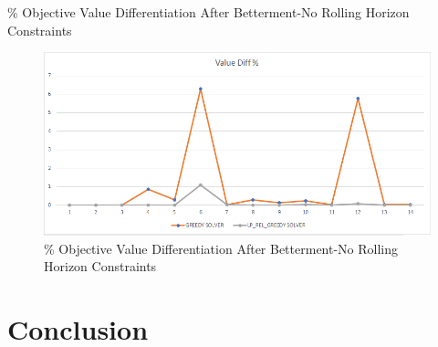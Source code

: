 \documentclass[11pt]{article}
\begin{document}
{\begin{landscape}
        \begin{table}[htb]
                \centering
                \caption[Short Caption for LoT]{\% Objective Value Differentiation After Betterment-No Rolling Horizon Constraints}\label{table:tbl_test_obj_diff_bett_no_rh}
        \end{table}
        \begin{figure}[htp]
            \centering
            \includegraphics[width=12cm]{value_diff_bett_no_rh}
            \caption{\% Objective Value Differentiation After Betterment-No Rolling Horizon Constraints}
            \label{fig:fig_value_diff_bett_no_rh}
        \end{figure}
    \end{landscape}
    \clearpage%
}


\newpage

\section{Conclusion} \label{s:conclusion}

\end{document}
